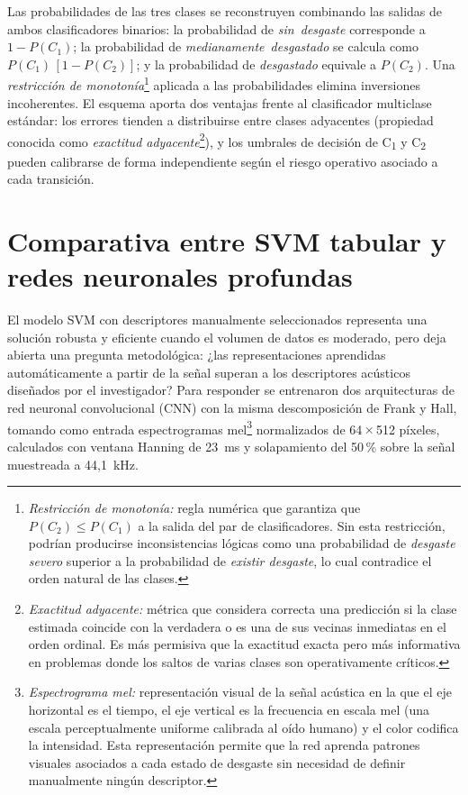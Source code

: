 \documentclass[12pt, letterpaper]{report}
\begin{document}
Las probabilidades de las tres clases se reconstruyen combinando las
salidas de ambos clasificadores binarios: la probabilidad de
\emph{sin~desgaste} corresponde a $1-P(C_1)$; la probabilidad de
\emph{medianamente~desgastado} se calcula como $P(C_1)\,[1-P(C_2)]$; y
la probabilidad de \emph{desgastado} equivale a $P(C_2)$. Una
\emph{restricción de monotonía}\footnote{\emph{Restricción de
monotonía:} regla numérica que garantiza que $P(C_2) \leq P(C_1)$ a la
salida del par de clasificadores. Sin esta restricción, podrían
producirse inconsistencias lógicas como una probabilidad de \emph{desgaste
severo} superior a la probabilidad de \emph{existir desgaste}, lo cual
contradice el orden natural de las clases.} aplicada a las
probabilidades elimina inversiones incoherentes. El esquema aporta dos
ventajas frente al clasificador multiclase estándar: los errores tienden
a distribuirse entre clases adyacentes (propiedad conocida como
\emph{exactitud adyacente}\footnote{\emph{Exactitud adyacente:} métrica
que considera correcta una predicción si la clase estimada coincide con
la verdadera o es una de sus vecinas inmediatas en el orden ordinal. Es
más permisiva que la exactitud exacta pero más informativa en problemas
donde los saltos de varias clases son operativamente críticos.}), y los
umbrales de decisión de C\textsubscript{1} y C\textsubscript{2} pueden
calibrarse de forma independiente según el riesgo operativo asociado a
cada transición.

\section{Comparativa entre SVM tabular y redes neuronales profundas}
\label{sec:svm-vs-cnn}

El modelo SVM con descriptores manualmente seleccionados representa una
solución robusta y eficiente cuando el volumen de datos es moderado,
pero deja abierta una pregunta metodológica: ¿las representaciones
aprendidas automáticamente a partir de la señal superan a los
descriptores acústicos diseñados por el investigador? Para responder se
entrenaron dos arquitecturas de red neuronal convolucional (CNN) con la
misma descomposición de Frank y Hall, tomando como entrada
espectrogramas mel\footnote{\emph{Espectrograma mel:} representación
visual de la señal acústica en la que el eje horizontal es el tiempo,
el eje vertical es la frecuencia en escala mel (una escala
perceptualmente uniforme calibrada al oído humano) y el color codifica
la intensidad. Esta representación permite que la red aprenda patrones
visuales asociados a cada estado de desgaste sin necesidad de definir
manualmente ningún descriptor.} normalizados de 64\,$\times$\,512
píxeles, calculados con ventana Hanning de 23~ms y solapamiento del
50\,\% sobre la señal muestreada a 44,1~kHz.
\end{document}
